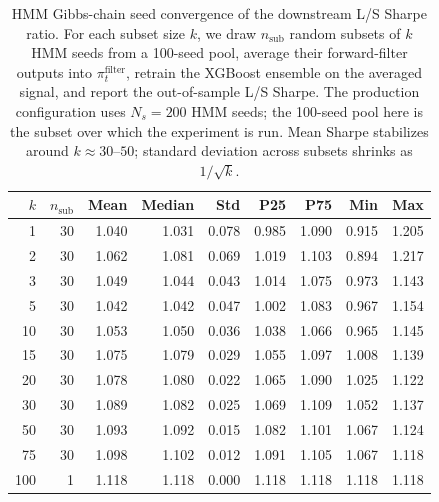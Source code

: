 \begin{table}[H]
\centering
\small
\begin{tabular}{r r r r r r r r r}
\toprule
$k$ & $n_{\text{sub}}$ & Mean & Median & Std & P25 & P75 & Min & Max \\
\midrule
1   & 30 & 1.040 & 1.031 & 0.078 & 0.985 & 1.090 & 0.915 & 1.205 \\
2   & 30 & 1.062 & 1.081 & 0.069 & 1.019 & 1.103 & 0.894 & 1.217 \\
3   & 30 & 1.049 & 1.044 & 0.043 & 1.014 & 1.075 & 0.973 & 1.143 \\
5   & 30 & 1.042 & 1.042 & 0.047 & 1.002 & 1.083 & 0.967 & 1.154 \\
10  & 30 & 1.053 & 1.050 & 0.036 & 1.038 & 1.066 & 0.965 & 1.145 \\
15  & 30 & 1.075 & 1.079 & 0.029 & 1.055 & 1.097 & 1.008 & 1.139 \\
20  & 30 & 1.078 & 1.080 & 0.022 & 1.065 & 1.090 & 1.025 & 1.122 \\
30  & 30 & 1.089 & 1.082 & 0.025 & 1.069 & 1.109 & 1.052 & 1.137 \\
50  & 30 & 1.093 & 1.092 & 0.015 & 1.082 & 1.101 & 1.067 & 1.124 \\
75  & 30 & 1.098 & 1.102 & 0.012 & 1.091 & 1.105 & 1.067 & 1.118 \\
100 & 1  & 1.118 & 1.118 & 0.000 & 1.118 & 1.118 & 1.118 & 1.118 \\
\bottomrule
\end{tabular}
\caption{HMM Gibbs-chain seed convergence of the downstream L/S Sharpe ratio. For each subset size $k$, we draw $n_{\text{sub}}$ random subsets of $k$ HMM seeds from a 100-seed pool, average their forward-filter outputs into $\pi_t^{\text{filter}}$, retrain the XGBoost ensemble on the averaged signal, and report the out-of-sample L/S Sharpe. The production configuration uses $N_s = 200$ HMM seeds; the 100-seed pool here is the subset over which the experiment is run. Mean Sharpe stabilizes around $k\approx 30$--$50$; standard deviation across subsets shrinks as $1/\sqrt{k}$.}
\label{tab:seed_convergence}
\end{table}
